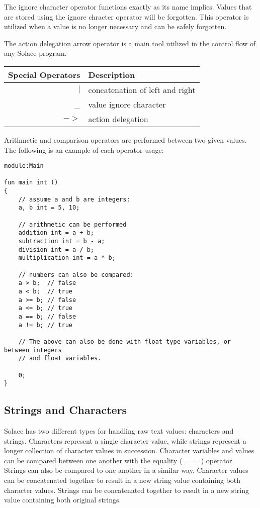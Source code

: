 \documentclass{article}
\begin{document}
The ignore character operator functions exactly as its name implies. Values that are stored
using the ignore chracter operator will be forgotten. This operator is utilized when a value
is no longer necessary and can be safely forgotten.

The action delegation arrow operator is a main tool utilized in the control flow of any
Solace program.

\begin{center}
\begin{tabular}{|r|l|}
	\hline
	Special Operators & Description \\
	\hline
	\hline
	$|$ & concatenation of left and right \\
	\_ & value ignore character \\
	$->$ & action delegation \\
	\hline
\end{tabular}
\end{center}

Arithmetic and comparison operators are performed between two given values. The following
is an example of each operator usage:

\begin{lstlisting}
module:Main

fun main int ()
{
	// assume a and b are integers:
	a, b int = 5, 10;
	
	// arithmetic can be performed
	addition int = a + b;
	subtraction int = b - a;
	division int = a / b;
	multiplication int = a * b;
	
	// numbers can also be compared:
	a > b;  // false
	a < b;  // true
	a >= b; // false
	a <= b; // true
	a == b; // false
	a != b; // true
	
	// The above can also be done with float type variables, or between integers
	// and float variables.
	
	0;
}
\end{lstlisting}

\subsection{Strings and Characters}

Solace has two different types for handling raw text values: characters and strings. Characters
represent a single character value, while strings represent a longer collection of character
values in succession. Character variables and values can be compared between one another
with the equality ($==$) operator. Strings can also be compared to one another in a
similar way. Character values can be concatenated together to result in a new string value
containing both character values. Strings can be concatenated together to result in a new
string value containing both original strings.
\end{document}
